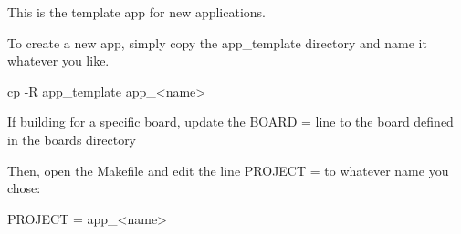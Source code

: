 This is the template app for new applications.

To create a new app, simply copy the app\+\_\+template directory and name it whatever you like.


\begin{DoxyCode}
cp -R app\_template app\_<name>
\end{DoxyCode}


If building for a specific board, update the {\ttfamily B\+O\+A\+RD =} line to the board defined in the {\ttfamily boards} directory

Then, open the Makefile and edit the line {\ttfamily P\+R\+O\+J\+E\+CT =} to whatever name you chose\+: 
\begin{DoxyCode}
PROJECT   = app\_<name>
\end{DoxyCode}
 